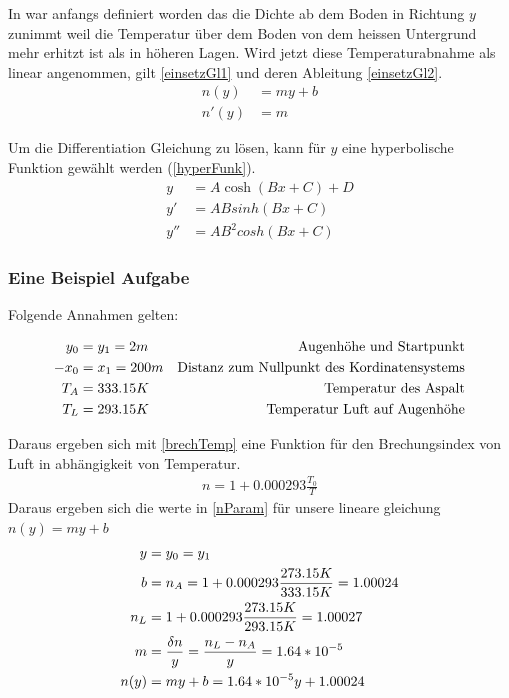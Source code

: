 In  war anfangs definiert worden das die Dichte ab dem Boden in Richtung $y$ zunimmt weil die Temperatur über dem Boden von dem heissen Untergrund mehr erhitzt ist als in höheren Lagen. Wird jetzt diese Temperaturabnahme als linear angenommen, gilt \eqref{einsetzGl1} und deren Ableitung \eqref{einsetzGl2}.
\begin{align}
	n(y)&=my+b \label{einsetzGl1} \\
	n'(y)&=m \label{einsetzGl2}
\end{align}

Um die Differentiation Gleichung zu lösen, kann für $y$ eine hyperbolische Funktion \cite{cosh} gewählt werden (\eqref{hyperFunk}).
\begin{align}
	y&=A\cosh(Bx+C)+D \label{hyperFunk} \\
	y'&= A B sinh(B x + C) \label{hyperFunkDx} \\
	y''&= A B^2 cosh(B x + C) \label{hyperFunkD2x}
\end{align}


\subsubsection{Eine Beispiel Aufgabe}

Folgende Annahmen gelten:

\begin{align}
	y_0&=y_1=2 m & \text{Augenhöhe und Startpunkt} \notag \\
	-x_0&=x_1 = 200m & \text{Distanz zum Nullpunkt des Kordinatensystems} \notag \\
	T_A&=333.15 K & \text{Temperatur des Aspalt}  \notag \\
	T_L&=293.15 K & \text{Temperatur Luft auf Augenhöhe}  \notag
\end{align}

Daraus ergeben sich mit \eqref{brechTemp} eine Funktion für den Brechungsindex von Luft in abhängigkeit von Temperatur.
\begin{align}
	n=1+0.000293\frac{T_0}{T}
	\label{brechTemp}
\end{align}
Daraus ergeben sich die werte in \eqref{nParam} für unsere lineare gleichung $n(y)=my+b$
\begin{align}
	y&=y_0=y_1 \notag \\
	b&=n_A=1+0.000293\frac{273.15 K}{333.15 K} = 1.00024 \notag \\
	n_L&=1+0.000293\frac{273.15 K}{293.15 K} = 1.00027 \notag \\
	m&=\frac{\delta n}{y}=\frac{n_L-n_A}{y}=1.64*10^{-5} \notag \\
	n(y)&=my+b=1.64*10^{-5}y +1.00024
	\label{nParam}
\end{align}

